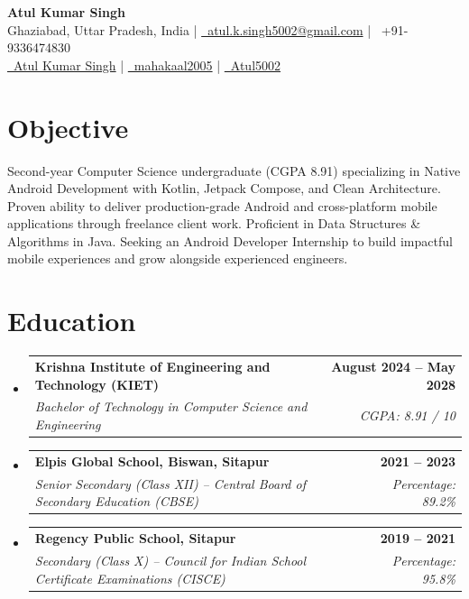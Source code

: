 \documentclass[a4paper,10pt]{article}
\makeatletter
\newcommand{\resumeSubheading}[4]{
  \vspace{-2pt}\item
    \begin{tabular*}{1.0\textwidth}[t]{l@{\extracolsep{\fill}}r}
      \textbf{#1} & \textbf{\small #2} \\
      \textit{\small#3} & \textit{\small #4} \\
    \end{tabular*}\vspace{-7pt}
}
\newcommand{\resumeSubHeadingListStart}{\begin{itemize}[leftmargin=0.0in, label={}]}
\newcommand{\resumeSubHeadingListEnd}{\end{itemize}}
\makeatother
\begin{document}
\begin{center}
    {\fontsize{18}{20}\selectfont\bfseries\color{HeadingBlue} Atul Kumar Singh} \\ \vspace{4pt}
    \small \color{HeadingBlue}
    \faMapMarker* Ghaziabad, Uttar Pradesh, India \quad|\quad 
    \href{mailto:atul.k.singh5002@gmail.com}{\faEnvelope\ atul.k.singh5002@gmail.com} \quad|\quad 
    \ +91-9336474830 \\ \vspace{6pt}
    \href{https://linkedin.com/in/atulkumarsingh5002}{\faLinkedin\ Atul Kumar Singh} \quad|\quad 
    \href{https://github.com/mahakaal2005}{\faGithub\ mahakaal2005} \quad|\quad 
    \href{https://leetcode.com/u/Atul5002/}{\faCode\ Atul5002}
    \vspace{-14pt}
\end{center}

\section{Objective}
\small{Second-year Computer Science undergraduate (CGPA 8.91) specializing in Native Android Development with Kotlin, Jetpack Compose, and Clean Architecture. Proven ability to deliver production-grade Android and cross-platform mobile applications through freelance client work. Proficient in Data Structures \& Algorithms in Java. Seeking an Android Developer Internship to build impactful mobile experiences and grow alongside experienced engineers.}
\vspace{2pt}

\section{Education}
  \resumeSubHeadingListStart
    \resumeSubheading
      {Krishna Institute of Engineering and Technology (KIET)}{August 2024 -- May 2028}
      {Bachelor of Technology in Computer Science and Engineering}{CGPA: 8.91 / 10}
      \vspace{2pt}
    \resumeSubheading
      {Elpis Global School, Biswan, Sitapur}{2021 -- 2023}
      {Senior Secondary (Class XII) -- Central Board of Secondary Education (CBSE)}{Percentage: 89.2\%}
      \vspace{2pt}
    \resumeSubheading
      {Regency Public School, Sitapur}{2019 -- 2021}
      {Secondary (Class X) -- Council for Indian School Certificate Examinations (CISCE)}{Percentage: 95.8\%}
  \resumeSubHeadingListEnd
\end{document}
